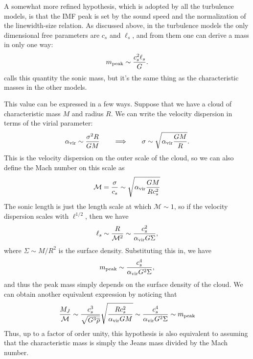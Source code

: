 A somewhat more refined hypothesis, which is adopted by all the turbulence models, is that the IMF peak is set by the sound speed and the normalization of the linewidth-size relation. As discussed above, in the turbulence models the only dimensional free parameters are $c_s$ and $\ell_s$, and from them one can derive a mass in only one way:
\begin{equation}
m_{\rm peak} \sim \frac{c_s^2 \ell_s}{G}.
\end{equation}
\citet{hopkins12d} calls this quantity the sonic mass, but it's the same thing as the characteristic masses in the other models.

This value can be expressed in a few ways. Suppose that we have a cloud of characteristic mass $M$ and radius $R$. We can write the velocity dispersion in terms of the virial parameter:
\begin{equation}
\alpha_{\rm vir} \sim \frac{\sigma^2 R}{G M}
\qquad\Longrightarrow\qquad
\sigma \sim \sqrt{\alpha_{\rm vir} \frac{G M}{R}}.
\end{equation}
This is the velocity dispersion on the outer scale of the cloud, so we can also define the Mach number on this scale as
\begin{equation}
\mathcal{M} = \frac{\sigma}{c_s} \sim \sqrt{\alpha_{\rm vir} \frac{G M}{R c_s^2}}
\end{equation}
The sonic length is just the length scale at which $\mathcal{M} \sim 1$, so if the velocity dispersion scales with $\ell^{1/2}$, then we have
\begin{equation}
\ell_s \sim \frac{R}{\mathcal{M}^2} \sim \frac{c_s^2}{\alpha_{\rm vir} G \Sigma},
\end{equation}
where $\Sigma\sim M/R^2$ is the surface density. Substituting this in, we have
\begin{equation}
m_{\rm peak} \sim \frac{c_s^4}{\alpha_{\rm vir} G^2 \Sigma},
\end{equation}
and thus the peak mass simply depends on the surface density of the cloud. We can obtain another equivalent expression by noticing that
\begin{equation}
\frac{M_J}{\mathcal{M}} \sim \frac{c_s^3}{\sqrt{G^3 \overline{\rho}}} \sqrt{\frac{R c_s^2}{\alpha_{\rm vir} G M}}
\sim \frac{c_s^4}{\alpha_{\rm vir} G^2 \Sigma} \sim m_{\rm peak}
\end{equation}
Thus, up to a factor of order unity, this hypothesis is also equivalent to assuming that the characteristic mass is simply the Jeans mass divided by the Mach number.

